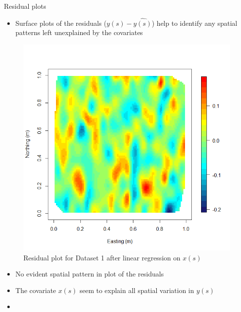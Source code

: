 \begin{frame}{Residual plots}
	\begin{itemize}
		\item Surface plots of the residuals ($y(s) - \widehat{y(s)}$) help to identify any spatial patterns left unexplained by the covariates 
	\end{itemize}
	\begin{figure}
		\includegraphics[scale=0.15,trim={2mm 5mm 2mm  5mm},clip]{../figures/data1_res.png}
		\caption{Residual plot for Dataset 1 after linear regression on $x(s)$}
	\end{figure}
	\pause
	\vskip -5mm \begin{itemize}
		\item No evident spatial pattern in plot of the residuals
		\item The covariate $x(s)$ seem to explain all spatial variation in $y(s)$
		\item {}
	\end{itemize}
\end{frame}

